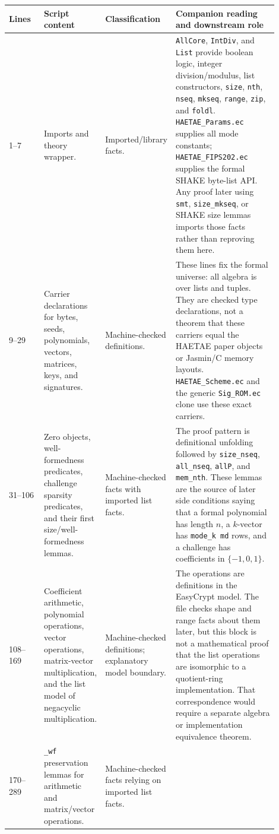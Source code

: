 \documentclass[11pt]{report}
\DeclareRobustCommand{\file}[1]{\ifmmode\text{\nolinkurl{#1}}\else\nolinkurl{#1}\fi}
\DeclareRobustCommand{\ec}[1]{\ifmmode\text{\nolinkurl{#1}}\else\nolinkurl{#1}\fi}
\theoremstyle{definition}
\theoremstyle{plain}
\begin{document}
\begin{longtable}{p{0.13\linewidth}p{0.18\linewidth}p{0.21\linewidth}p{0.38\linewidth}}
\toprule
\textbf{Lines} & \textbf{Script content} & \textbf{Classification} &
\textbf{Companion reading and downstream role} \\
\midrule
1--7 &
Imports and theory wrapper. &
Imported/library facts. &
\ec{AllCore}, \ec{IntDiv}, and \ec{List} provide boolean logic, integer
division/modulus, list constructors, \ec{size}, \ec{nth}, \ec{nseq},
\ec{mkseq}, \ec{range}, \ec{zip}, and \ec{foldl}.  \file{HAETAE\_Params.ec}
supplies all mode constants; \file{HAETAE\_FIPS202.ec} supplies the formal
SHAKE byte-list API.  Any proof later using \ec{smt}, \ec{size\_mkseq},
or SHAKE size lemmas imports those facts rather than reproving them here. \\
\midrule
9--29 &
Carrier declarations for bytes, seeds, polynomials, vectors, matrices, keys,
and signatures. &
Machine-checked definitions. &
These lines fix the formal universe: all algebra is over lists and tuples.
They are checked type declarations, not a theorem that these carriers equal
the HAETAE paper objects or Jasmin/C memory layouts.  \file{HAETAE\_Scheme.ec}
and the generic \file{Sig\_ROM.ec} clone use these exact carriers. \\
\midrule
31--106 &
Zero objects, well-formedness predicates, challenge sparsity predicates, and
their first size/well-formedness lemmas. &
Machine-checked facts with imported list facts. &
The proof pattern is definitional unfolding followed by \ec{size\_nseq},
\ec{all\_nseq}, \ec{allP}, and \ec{mem\_nth}.  These lemmas are the source of
later side conditions saying that a formal polynomial has length \(n\), a
\(k\)-vector has \ec{mode\_k md} rows, and a challenge has coefficients in
\(\{-1,0,1\}\). \\
\midrule
108--169 &
Coefficient arithmetic, polynomial operations, vector operations, matrix-vector
multiplication, and the list model of negacyclic multiplication. &
Machine-checked definitions; explanatory model boundary. &
The operations are definitions in the EasyCrypt model.  The file checks shape
and range facts about them later, but this block is not a mathematical proof
that the list operations are isomorphic to a quotient-ring implementation.
That correspondence would require a separate algebra or implementation
equivalence theorem. \\
\midrule
170--289 &
\ec{\_wf} preservation lemmas for arithmetic and matrix/vector operations. &
Machine-checked facts relying on imported list facts. &

\end{longtable}
\end{document}
